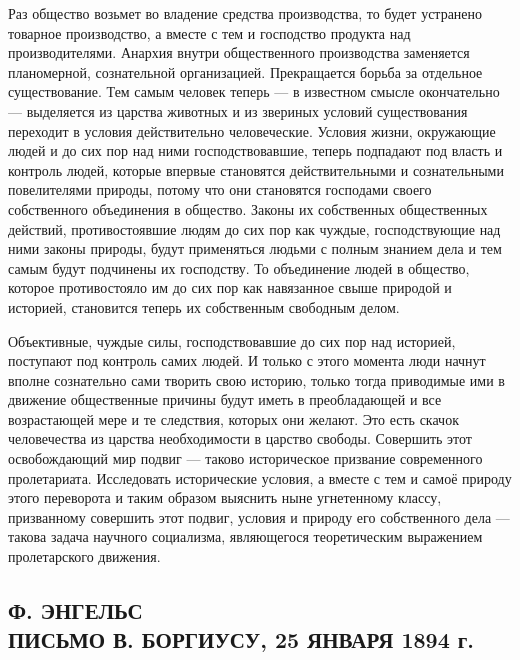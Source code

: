 \documentclass[12pt]{article}
\newcommand{\parnum}{(\arabic{parcount})}
\newcounter{parcount}
\newenvironment{parnumbers}{%
  \par%
  \everypar{\noindent \stepcounter{parcount}\marginpar[]{\parnum}}%
}{}
\begin{document}
\begin{parnumbers}
    Раз общество возьмет во владение средства производства, то будет устранено товарное производство, а вместе с тем и господство продукта над производителями. Анархия внутри общественного производства заменяется планомерной, сознательной организацией. Прекращается борьба за отдельное существование. Тем самым человек теперь — в известном смысле окончательно — выделяется из царства животных и из звериных условий существования переходит в условия действительно человеческие. Условия жизни, окружающие людей и до сих пор над ними господствовавшие, теперь подпадают под власть и контроль людей, которые впервые становятся действительными и сознательными повелителями природы, потому что они становятся господами своего собственного объединения в общество. Законы их собственных общественных действий, противостоявшие людям до сих пор как чуждые, господствующие над ними законы природы, будут применяться людьми с полным знанием дела и тем самым будут подчинены их господству. То объединение людей в общество, которое противостояло им до сих пор как навязанное свыше природой и историей, становится теперь их собственным свободным делом.

    Объективные, чуждые силы, господствовавшие до сих пор над историей, поступают под контроль самих людей. И только с этого момента люди начнут вполне сознательно сами творить свою историю, только тогда приводимые ими в движение общественные причины будут иметь в преобладающей и все возрастающей мере и те следствия, которых они желают. Это есть скачок человечества из царства необходимости в царство свободы. Совершить этот освобождающий мир подвиг — таково историческое призвание современного пролетариата. Исследовать исторические условия, а вместе с тем и самоё природу этого переворота и таким образом выяснить ныне угнетенному классу, призванному совершить этот подвиг, условия и природу его собственного дела — такова задача научного социализма, являющегося теоретическим выражением пролетарского движения.
\end{parnumbers}

\subsection{Ф. ЭНГЕЛЬС \\
    ПИСЬМО В. БОРГИУСУ, 25 ЯНВАРЯ 1894 г.}
\end{document}

